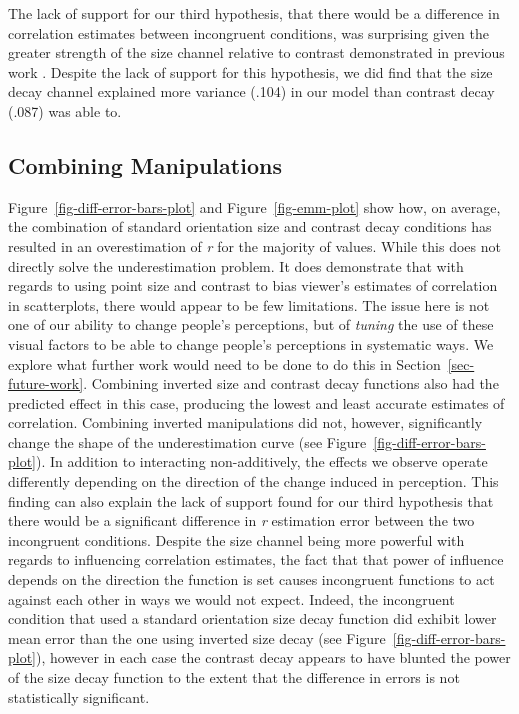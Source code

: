 \documentclass[manuscript, review, anonymous, screen]{acmart}
\begin{document}
The lack of support for our third hypothesis, that there would be a
difference in correlation estimates between incongruent conditions, was
surprising given the greater strength of the size channel relative to
contrast demonstrated in previous work
\citep{strain_2023, strain_2023b}. Despite the lack of support for this
hypothesis, we did find that the size decay channel explained more
variance (.104) in our model than contrast decay (.087) was able to.

\hypertarget{sec-combining}{%
\subsection{Combining Manipulations}\label{sec-combining}}

Figure~\ref{fig-diff-error-bars-plot} and Figure~\ref{fig-emm-plot} show
how, on average, the combination of standard orientation size and
contrast decay conditions has resulted in an overestimation of \emph{r}
for the majority of values. While this does not directly solve the
underestimation problem. It does demonstrate that with regards to using
point size and contrast to bias viewer's estimates of correlation in
scatterplots, there would appear to be few limitations. The issue here
is not one of our ability to change people's perceptions, but of
\emph{tuning} the use of these visual factors to be able to change
people's perceptions in systematic ways. We explore what further work
would need to be done to do this in Section~\ref{sec-future-work}.
Combining inverted size and contrast decay functions also had the
predicted effect in this case, producing the lowest and least accurate
estimates of correlation. Combining inverted manipulations did not,
however, significantly change the shape of the underestimation curve
(see Figure~\ref{fig-diff-error-bars-plot}). In addition to interacting
non-additively, the effects we observe operate differently depending on
the direction of the change induced in perception. This finding can also
explain the lack of support found for our third hypothesis that there
would be a significant difference in \emph{r} estimation error between
the two incongruent conditions. Despite the size channel being more
powerful with regards to influencing correlation estimates, the fact
that that power of influence depends on the direction the function is
set causes incongruent functions to act against each other in ways we
would not expect. Indeed, the incongruent condition that used a standard
orientation size decay function did exhibit lower mean error than the
one using inverted size decay (see
Figure~\ref{fig-diff-error-bars-plot}), however in each case the
contrast decay appears to have blunted the power of the size decay
function to the extent that the difference in errors is not
statistically significant.
\end{document}
